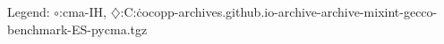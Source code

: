 Legend: {\color{CornflowerBlue}$\circ$}:cma-IH, {\color{Orange}$\diamondsuit$}:C:\Users\tristan\.cocopp\data-archives\numbbo.github.io\data-archive\data-archive\bbob-mixint-gecco-benchmark\CMA-ES-pycma.tgz